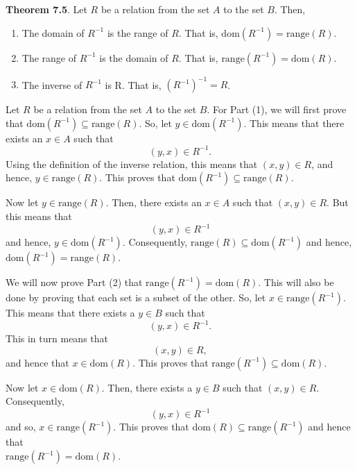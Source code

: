 \documentclass[11pt]{article}
\begin{document}
\noindent
\textbf{Theorem 7.5}.  Let  $R$  be a relation from the set  $A$  to the set  $B$.  Then,
\begin{enumerate}
\item The domain of  $R^{ - 1} $ is the range of  $R$.  That is, 
$\text{dom}\left( {R^{ - 1} } \right) = \text{range}\left( R \right)$.

\item The range of  $R^{ - 1} $  is the domain of  $R$.   That is, 
$\text{range}\left( {R^{ - 1} } \right) = \text{dom}\left( R \right)$.

\item The inverse of  $R^{ - 1} $  is  R.  That is, $\left( {R^{ - 1} } \right)^{ - 1}  = R$.
\end{enumerate}

\begin{myproof}
Let  $R$  be a relation from the set  $A$  to the set  $B$.  For Part (1), we will first prove that  $\text{dom}\left( {R^{ - 1} } \right) \subseteq \text{range}\left( R \right)$.  So, let  
$y \in \text{dom}\left( {R^{ - 1} } \right)$.  This means that there exists an  $x \in A$ such that
\[
\left( {y, x} \right) \in R^{ - 1}.
\]
Using the definition of the inverse relation, this means that  $\left( {x, y} \right) \in R$, and hence,  $y \in \text{range}\left( R \right)$.  This proves that  
$\text{dom}\left( {R^{ - 1} } \right) \subseteq \text{range}\left( R \right)$.

Now let  $y \in \text{range}\left( R \right)$.  Then, there exists an  $x \in A$ such that  
$\left( {x, y} \right) \in R$.  But this means that  
\[
\left( {y, x} \right) \in R^{ - 1} 
\]
and hence,  $y \in \text{dom}\left( {R^{ - 1} } \right)$.  Consequently,  
$\text{range}\left( R \right) \subseteq \text{dom}\left( {R^{ - 1} } \right)$ and hence, 
$\text{dom}\left( {R^{ - 1} } \right) = \text{range}\left( R \right)$.
\vskip6pt

We will now prove Part (2) that  
$\text{range}\left( {R^{ - 1} } \right) = \text{dom}\left( R \right)$.  This will also be done by proving that each set is a subset of the other.  So, let  
$x \in \text{range}\left( {R^{ - 1} } \right)$. This means that there exists a  $y \in B$ such that  
\[
\left( {y, x} \right) \in R^{ - 1}.
\]
This in turn means that
\[
\left( {x, y} \right) \in R,
\]
and hence that  $x \in \text{dom}\left( R \right)$.  This proves that  
$\text{range}\left( {R^{ - 1} } \right) \subseteq \text{dom}\left( R \right)$. 

Now let $x \in \text{dom}\left( R \right)$.  Then, there exists a  $y \in B$ such that  
$\left( {x, y} \right) \in R$.  Consequently,  
\[
\left( {y, x} \right) \in R^{ - 1} 
\]
and so, $x \in \text{range}\left( {R^{ - 1} } \right)$.  This proves that  
$\text{dom}\left( R \right) \subseteq \text{range}\left( {R^{ - 1} } \right)$ and hence that \\ $\text{range}\left( {R^{ - 1} } \right) = \text{dom}\left( R \right)$.
\vskip6pt


\end{myproof}
\end{document}
